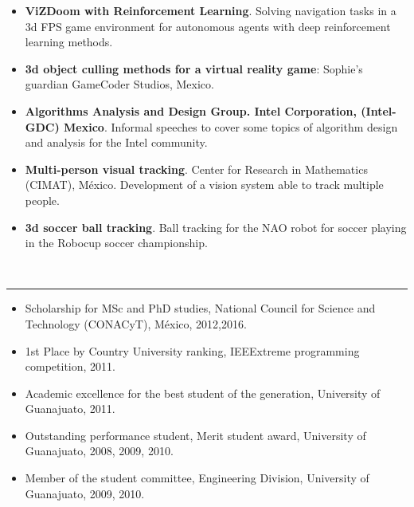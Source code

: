 \documentclass[10 pt]{article}
\newcommand{\mypartitle}[2][2.]{\vspace*{-#1 ex}~\\{\noindent {\bf #2}}}
\begin{document}
\begin{itemize}[noitemsep]


\item \textbf{ViZDoom with Reinforcement Learning}. Solving navigation tasks in a 3d FPS game 
environment for autonomous agents with deep reinforcement learning methods.

\item \textbf{3d object culling methods for a virtual reality game}: Sophie's guardian GameCoder Studios, Mexico.

\item \textbf{Algorithms Analysis and Design Group. Intel Corporation, (Intel-GDC) Mexico}. 
Informal speeches to cover some topics of algorithm design and analysis for the Intel community.


\item \textbf{Multi-person visual tracking}. Center for Research in Mathematics (CIMAT), México. 
Development of a vision system able to track multiple people.

\item \textbf{3d soccer ball tracking}. Ball tracking for the NAO robot for soccer playing in the Robocup soccer championship.


\end{itemize}

\mypartitle{Awards and Grants}
\medskip
\hrule height 0.05cm

\begin{itemize}[noitemsep]

\item Scholarship for MSc and PhD studies, National Council for Science and Technology (CONACyT), México, 2012,2016.
\item 1st Place by Country University ranking, IEEExtreme programming competition, 2011.
\item Academic excellence for the best student of the generation, University of Guanajuato, 2011.
\item Outstanding performance student, Merit student award, University of Guanajuato, 2008, 2009, 2010.
\item Member of the student committee, Engineering Division, University of Guanajuato, 2009, 2010.

\end{itemize}
\end{document}
